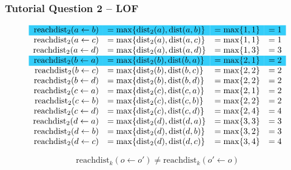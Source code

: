 \documentclass[aspectratio=169, 10pt]{beamer}
\begin{document}
\begin{frame}[t]
    \frametitle{Tutorial Question 2 -- LOF}
    \small

    \begin{equation*}
        \begin{array}{rlll}
            \rowcolor[HTML]{34CDF9} \text{reachdist}_2(a \leftarrow b) & = \max\{\text{dist}_2(a), \text{dist}(a, b)\} & = \max\{1, 1\} & = 1\\
            \text{reachdist}_2(a \leftarrow c) & = \max\{\text{dist}_2(a), \text{dist}(a, c)\} & = \max\{1, 1\} & = 1\\
            \text{reachdist}_2(a \leftarrow d) & = \max\{\text{dist}_2(a), \text{dist}(a, d)\} & = \max\{1, 3\} & = 3\\
            \rowcolor[HTML]{34CDF9} \text{reachdist}_2(b \leftarrow a) & = \max\{\text{dist}_2(b), \text{dist}(b, a)\} & = \max\{2, 1\} & = 2\\
            \text{reachdist}_2(b \leftarrow c) & = \max\{\text{dist}_2(b), \text{dist}(b, c)\} & = \max\{2, 2\} & = 2\\
            \text{reachdist}_2(b \leftarrow d) & = \max\{\text{dist}_2(b), \text{dist}(b, d)\} & = \max\{2, 2\} & = 2\\
            \text{reachdist}_2(c \leftarrow a) & = \max\{\text{dist}_2(c), \text{dist}(c, a)\} & = \max\{2, 1\} & = 2\\
            \text{reachdist}_2(c \leftarrow b) & = \max\{\text{dist}_2(c), \text{dist}(c, b)\} & = \max\{2, 2\} & = 2\\
            \text{reachdist}_2(c \leftarrow d) & = \max\{\text{dist}_2(c), \text{dist}(c, d)\} & = \max\{2, 4\} & = 4\\
            \text{reachdist}_2(d \leftarrow a) & = \max\{\text{dist}_2(d), \text{dist}(d, a)\} & = \max\{3, 3\} & = 3\\
            \text{reachdist}_2(d \leftarrow b) & = \max\{\text{dist}_2(d), \text{dist}(d, b)\} & = \max\{3, 2\} & = 3\\
            \text{reachdist}_2(d \leftarrow c) & = \max\{\text{dist}_2(d), \text{dist}(d, c)\} & = \max\{3, 4\} & = 4\\
        \end{array}
    \end{equation*}

    \[
        \text{reachdist}_k(o \leftarrow o') \neq \text{reachdist}_k(o' \leftarrow o)
    \]
\end{frame}
\end{document}
